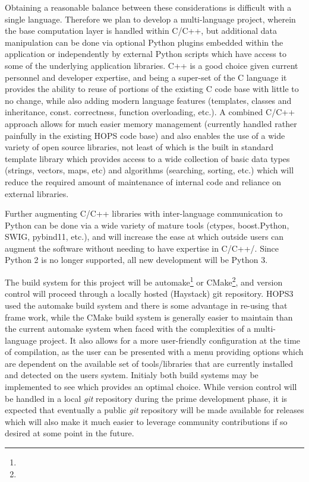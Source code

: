 \documentclass[hidelinks]{article}
\makeatletter
\newcommand\urlfootnote@[1]{\footnote{\url@{#1}}}
\DeclareRobustCommand{\urlfootnote}{\hyper@normalise\urlfootnote@}
\makeatother
\begin{document}
Obtaining a reasonable balance between these considerations is difficult with a single language. Therefore we
plan to develop a multi-language project, wherein the base computation layer is handled within C/C++,
but additional data manipulation can be done via optional Python plugins embedded within the application
or independently by external Python scripts which have access to some of the underlying application libraries.
C++ is a good choice given current personnel and developer expertise, and being a super-set of the C language
it provides the ability to reuse of portions of the existing C code base with little to no change, while also adding modern language features
(templates, classes and inheritance, const. correctness, function overloading, etc.). A combined C/C++ approach
allows for much easier memory management (currently handled rather painfully in the existing HOPS code base) and also
enables the use of a wide variety of open source libraries, not least of which is the built in standard template library
which provides access to a wide collection of basic data types (strings, vectors, maps, etc) and algorithms (searching, sorting, etc.)
which will reduce the required amount of maintenance of internal code and reliance on external libraries.

Further augmenting C/C++ libraries with inter-language communication to Python can be done via a wide variety of mature tools
(ctypes, boost.Python, SWIG, pybind11, etc.), and will increase the ease at which outside users can augment the software without
needing to have expertise in C/C++/. Since Python 2 is no longer supported, all new development will be Python 3.

The build system for this project will be automake\urlfootnote{https://www.gnu.org/software/automake/} or CMake\urlfootnote{https://cmake.org}, and version control will proceed through a locally hosted (Haystack) git repository. HOPS3 used the automake build system and there is some
advantage in re-using that frame work, while the CMake build system is generally easier to maintain than the current automake system when faced with the complexities of a multi-language project. It also allows for a more user-friendly configuration at the time of compilation, as the user can be presented with a menu providing options which are dependent on the available set of tools/libraries that are currently installed and detected on the users system. Initialy
both build systems may be implemented to see which provides an optimal choice. While version control will be handled in a local \textit{git} repository during
the prime development phase, it is expected that eventually a public \textit{git} repository will be made available for releases which will also make it much easier to leverage community contributions if so desired at some point in the future.
\end{document}
